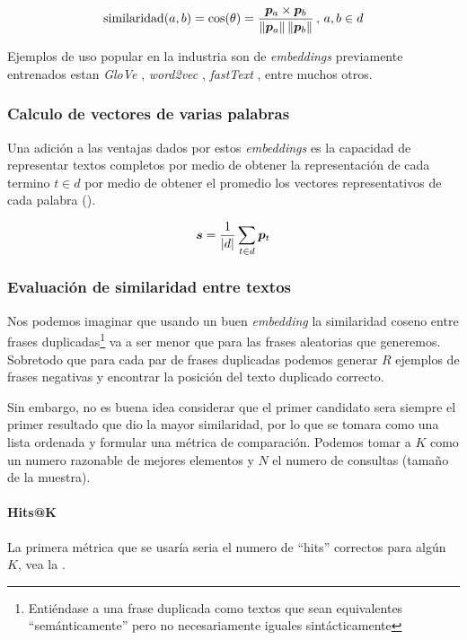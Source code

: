 \begin{equation} \label{eq:cosine-similarity}
  \mathrm{similaridad}(a, b) = \cos(\theta) = \frac{{\bm{p}}_a \times {\bm{p}}_b}{\left\lVert{\bm{p}}_a\right\rVert \left\lVert{\bm{p}}_b\right\rVert} \,,\, a, b \in d
\end{equation}

Ejemplos de uso popular en la industria son de \emph{embeddings} previamente entrenados estan \emph{GloVe} \cite{pennington2014glove}, \emph{word2vec} \cite{Mikolov2014}, \emph{fastText} \cite{joulin2016fasttext}, entre muchos otros.

\subsubsection{Calculo de vectores de varias palabras}
Una adición a las ventajas dados por estos \emph{embeddings} es la capacidad de representar textos completos por medio de obtener la representación de cada termino $t \in d$ por medio de obtener el promedio los vectores representativos de cada palabra ().

\begin{equation} \label{eq:embeddings-sum}
  {\bm{s}} = \frac{1}{|d|} \sum_{t \in d} {\bm{p}}_{t}
\end{equation}

\subsubsection{Evaluación de similaridad entre textos}
Nos podemos imaginar que usando un buen \emph{embedding} la similaridad coseno entre frases duplicadas\footnote{Entiéndase a una frase duplicada como textos que sean equivalentes ``semánticamente'' pero no necesariamente iguales sintácticamente} va a ser menor que para las frases aleatorias que generemos. Sobretodo que para cada par de frases duplicadas podemos generar $R$ ejemplos de frases negativas y encontrar la posición del texto duplicado correcto.

Sin embargo, no es buena idea considerar que el primer candidato sera siempre el primer resultado que dio la mayor similaridad, por lo que se tomara como una lista ordenada y formular una métrica de comparación. Podemos tomar a $K$ como un numero razonable de mejores elementos y $N$ el numero de consultas (tamaño de la muestra).

\paragraph{Hits@K}
La primera métrica que se usaría seria el numero de ``hits'' correctos para algún $K$, vea la .

